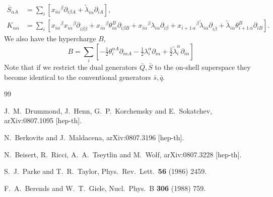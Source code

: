 \documentclass[12pt]{article}
\begin{document}
{\begin{align}
\overline{S}_{\dot{\alpha} A} &= \sum_i [x_{i \dot{\alpha}}{}^{\beta}
  \partial_{i \beta A} + \tilde{\lambda}_{i \dot{\alpha}}
  \partial_{iA}],\label{fssbarS}\\ \label{KK}
K_{\alpha \dot{\alpha}} &= \sum_i [x_{i \alpha}{}^{\dot{\beta}} x_{i
    \dot{\alpha}}{}^{\beta} \partial_{i \beta \dot{\beta}} + x_{i
    \dot{\alpha}}{}^{\beta} \theta_{i \alpha}^B \partial_{i \beta B} +
  x_{i \dot{\alpha}}{}^{\beta} \lambda_{i \alpha} \partial_{i \beta}
  + x_{i+1 \,\alpha}{}^{\dot{\beta}} \tilde{\lambda}_{i \dot{\alpha}}
  \partial_{i \dot{\beta}} + \tilde{\lambda}_{i \dot{\alpha}} \theta_{i+1\,
    \alpha}^B \partial_{i B}].
\end{align}
We also have the hypercharge $B$,
\begin{equation}
B=\sum_i[- \tfrac{1}{2}\theta_i^{\alpha A} \partial_{i \alpha A} -
  \tfrac{1}{2} \lambda_i^\alpha \partial_{i \alpha} +
   \tfrac{1}{2}\tilde{\lambda}_i^{\dot{\alpha}} \partial_{i \dot{\alpha}}]
\end{equation}
Note that if we restrict the dual generators $\bar{Q},\bar{S}$ to the on-shell superspace they
become identical to the conventional generators $\bar s, \bar q$.


\begin{thebibliography}{99}

  J.~M.~Drummond, J.~Henn, G.~P.~Korchemsky and E.~Sokatchev,
  arXiv:0807.1095 [hep-th].

  N.~Berkovits and J.~Maldacena,
  arXiv:0807.3196 [hep-th].

  N.~Beisert, R.~Ricci, A.~A.~Tseytlin and M.~Wolf,
  arXiv:0807.3228 [hep-th].

  S.~J.~Parke and T.~R.~Taylor,
  Phys.\ Rev.\ Lett.\  {\bf 56} (1986) 2459.

  F.~A.~Berends and W.~T.~Giele,
  Nucl.\ Phys.\  B {\bf 306} (1988) 759.


\end{thebibliography}}
\end{document}
